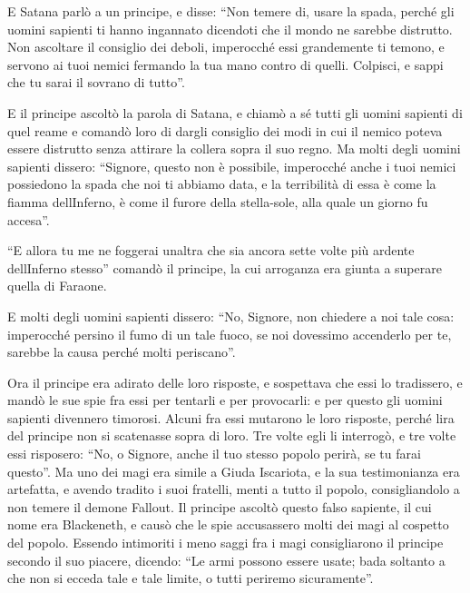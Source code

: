 E Satana parlò a un principe, e disse: ``Non temere di, usare la spada,
perché gli uomini sapienti ti hanno ingannato dicendoti che il mondo ne
sarebbe distrutto. Non ascoltare il consiglio dei deboli, imperocché
essi grandemente ti temono, e servono ai tuoi nemici fermando la tua
mano contro di quelli. Colpisci, e sappi che tu sarai il sovrano di
tutto''.

E il principe ascoltò la parola di Satana, e chiamò a sé tutti gli
uomini sapienti di quel reame e comandò loro di dargli consiglio dei
modi in cui il nemico poteva essere distrutto senza attirare la collera
sopra il suo regno. Ma molti degli uomini sapienti dissero: ``Signore,
questo non è possibile, imperocché anche i tuoi nemici possiedono la
spada che noi ti abbiamo data, e la terribilità di essa è come la fiamma
dell\textquotesingle Inferno, è come il furore della stella-sole, alla
quale un giorno fu accesa''.

``E allora tu me ne foggerai un\textquotesingle altra che sia ancora
sette volte più ardente dell\textquotesingle Inferno stesso'' comandò il
principe, la cui arroganza era giunta a superare quella di Faraone.

E molti degli uomini sapienti dissero: ``No, Signore, non chiedere a noi
tale cosa: imperocché persino il fumo di un tale fuoco, se noi dovessimo
accenderlo per te, sarebbe la causa perché molti periscano''.

Ora il principe era adirato delle loro risposte, e sospettava che essi
lo tradissero, e mandò le sue spie fra essi per tentarli e per
provocarli: e per questo gli uomini sapienti divennero timorosi. Alcuni
fra essi mutarono le loro risposte, perché l\textquotesingle ira del
principe non si scatenasse sopra di loro. Tre volte egli li interrogò, e
tre volte essi risposero: ``No, o Signore, anche il tuo stesso popolo
perirà, se tu farai questo''. Ma uno dei magi era simile a Giuda
Iscariota, e la sua testimonianza era artefatta, e avendo tradito i suoi
fratelli, menti a tutto il popolo, consigliandolo a non temere il demone
Fallout. Il principe ascoltò questo falso sapiente, il cui nome era
Blackeneth, e causò che le spie accusassero molti dei magi al cospetto
del popolo. Essendo intimoriti i meno saggi fra i magi consigliarono il
principe secondo il suo piacere, dicendo: ``Le armi possono essere
usate; bada soltanto a che non si ecceda tale e tale limite, o tutti
periremo sicuramente''.


